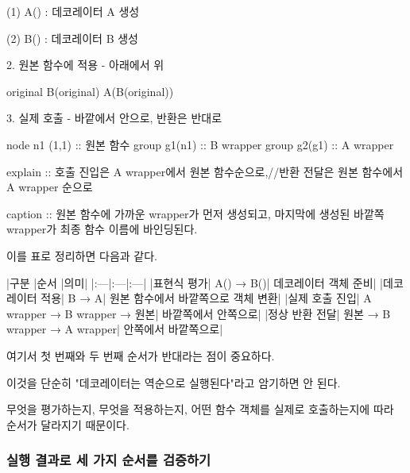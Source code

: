 \begin{dhksmry}
    (1) A() : 데코레이터 A 생성

    (2) B() : 데코레이터 B 생성
\end{dhksmry}

\begin{dhknote}
\begin{dhksmry}[centered]
2. 원본 함수에 적용 - 아래에서 위
\end{dhksmry}
\end{dhknote}

\begin{dhksmry}[centered]
original \ra B(original) \ra A(B(original))
\end{dhksmry}

\begin{dhknote}
\begin{dhksmry}[centered]
3. 실제 호출 - 바깥에서 안으로, 반환은 반대로
\end{dhksmry}
\end{dhknote}

\begin{dhkgraph}[uniform]
node n1 (1,1) :: 원본 함수
group g1(n1) :: B wrapper
group g2(g1) :: A wrapper

explain :: 호출 진입은 A wrapper에서 원본 함수순으로,//반환 전달은 원본 함수에서 A wrapper 순으로

caption :: 원본 함수에 가까운 wrapper가 먼저 생성되고, 마지막에 생성된 바깥쪽 wrapper가 최종 함수 이름에 바인딩된다.
\end{dhkgraph}

이를 표로 정리하면 다음과 같다.

\begin{dhktable}
|구분	|순서	|의미|
|:---|:---|:---|
|표현식 평가|	A() → B()|	데코레이터 객체 준비|
|데코레이터 적용|	B → A|	원본 함수에서 바깥쪽으로 객체 변환|
|실제 호출 진입|	A wrapper → B wrapper → 원본|	바깥쪽에서 안쪽으로|
|정상 반환 전달|	원본 → B wrapper → A wrapper|	안쪽에서 바깥쪽으로|
\end{dhktable}

여기서 첫 번째와 두 번째 순서가 반대라는 점이 중요하다.

이것을 단순히 "데코레이터는 역순으로 실행된다"라고 암기하면 안 된다.

무엇을 평가하는지, 무엇을 적용하는지, 어떤 함수 객체를 실제로 호출하는지에 따라 순서가 달라지기 때문이다.

\subsubsection{실행 결과로 세 가지 순서를 검증하기}

